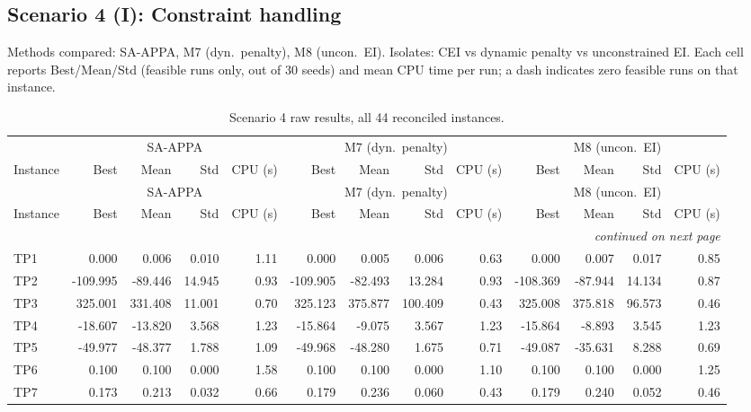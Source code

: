 \subsection{Scenario 4 (I): Constraint handling}
\label{app:scenario4}
Methods compared: SA-APPA, M7 (dyn.\ penalty), M8 (uncon.\ EI). Isolates: CEI vs dynamic penalty vs unconstrained EI. Each cell reports Best/Mean/Std (feasible runs only, out of 30 seeds) and mean CPU time per run; a dash indicates zero feasible runs on that instance.

\begingroup\scriptsize
\begin{longtable}{lrrrrrrrrrrrr}
\caption{Scenario 4 raw results, all 44 reconciled instances.}\label{tab:scenario4}\\
\toprule
 & \multicolumn{4}{c}{SA-APPA} & \multicolumn{4}{c}{M7 (dyn.\ penalty)} & \multicolumn{4}{c}{M8 (uncon.\ EI)} \\
\cmidrule(lr){2-5} \cmidrule(lr){6-9} \cmidrule(lr){10-13}
Instance & Best & Mean & Std & CPU (s) & Best & Mean & Std & CPU (s) & Best & Mean & Std & CPU (s) \\
\midrule
\endfirsthead
\toprule
 & \multicolumn{4}{c}{SA-APPA} & \multicolumn{4}{c}{M7 (dyn.\ penalty)} & \multicolumn{4}{c}{M8 (uncon.\ EI)} \\
\cmidrule(lr){2-5} \cmidrule(lr){6-9} \cmidrule(lr){10-13}
Instance & Best & Mean & Std & CPU (s) & Best & Mean & Std & CPU (s) & Best & Mean & Std & CPU (s) \\
\midrule
\endhead
\midrule\multicolumn{13}{r}{\emph{continued on next page}}\\\midrule
\endfoot
\bottomrule
\endlastfoot
TP1 & 0.000 & 0.006 & 0.010 & 1.11 & 0.000 & 0.005 & 0.006 & 0.63 & 0.000 & 0.007 & 0.017 & 0.85 \\
TP2 & -109.995 & -89.446 & 14.945 & 0.93 & -109.905 & -82.493 & 13.284 & 0.93 & -108.369 & -87.944 & 14.134 & 0.87 \\
TP3 & 325.001 & 331.408 & 11.001 & 0.70 & 325.123 & 375.877 & 100.409 & 0.43 & 325.008 & 375.818 & 96.573 & 0.46 \\
TP4 & -18.607 & -13.820 & 3.568 & 1.23 & -15.864 & -9.075 & 3.567 & 1.23 & -15.864 & -8.893 & 3.545 & 1.23 \\
TP5 & -49.977 & -48.377 & 1.788 & 1.09 & -49.968 & -48.280 & 1.675 & 0.71 & -49.087 & -35.631 & 8.288 & 0.69 \\
TP6 & 0.100 & 0.100 & 0.000 & 1.58 & 0.100 & 0.100 & 0.000 & 1.10 & 0.100 & 0.100 & 0.000 & 1.25 \\
TP7 & 0.173 & 0.213 & 0.032 & 0.66 & 0.179 & 0.236 & 0.060 & 0.43 & 0.179 & 0.240 & 0.052 & 0.46 \\

\end{longtable}
